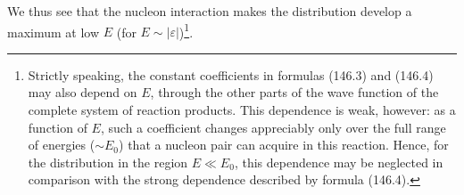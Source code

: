 We thus see that the nucleon interaction makes the distribution develop a maximum at low $E$ (for $E\sim|\varepsilon|$)\footnote{Strictly speaking, the constant coefficients in formulas (146.3) and (146.4) may also depend on $E$, through the other parts of the wave function of the complete system of reaction products. This dependence is weak, however: as a function of $E$, such a coefficient changes appreciably only over the full range of energies ($\sim E_0$) that a nucleon pair can acquire in this reaction. Hence, for the distribution in the region $E\ll E_0$, this dependence may be neglected in comparison with the strong dependence described by formula (146.4).}.
